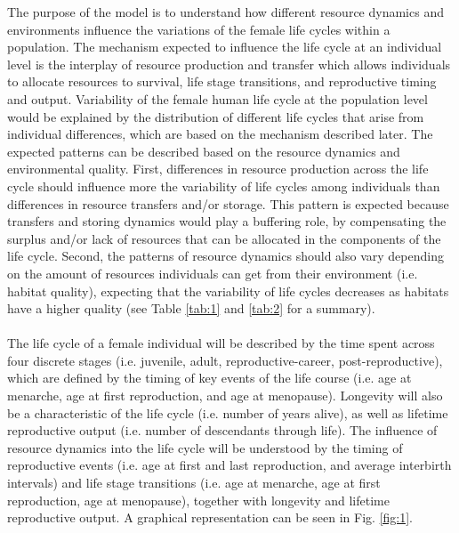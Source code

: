\documentclass{article}
\begin{document}
The purpose of the model is to understand how different resource dynamics and environments influence the variations of the female life cycles within a population. The mechanism expected to influence the life cycle at an individual level is the interplay of resource production and transfer which allows individuals to allocate resources to survival, life stage transitions, and reproductive timing and output. Variability of the female human life cycle at the population level would be explained by the distribution of different life cycles that arise from individual differences, which are based on the mechanism described later. The expected patterns can be described based on the resource dynamics and environmental quality. First, differences in resource production across the life cycle should influence more the variability of life cycles among individuals than differences in resource transfers and/or storage. This pattern is expected because transfers and storing dynamics would play a buffering role, by compensating the surplus and/or lack of resources that can be allocated in the components of the life cycle. Second, the patterns of resource dynamics should also vary depending on the amount of resources individuals can get from their environment (i.e. habitat quality), expecting that the variability of life cycles decreases as habitats have a higher quality (see Table \ref{tab:1} and \ref{tab:2} for a summary).
\\\\
The life cycle of a female individual will be described by the time spent across four discrete stages (i.e. juvenile, adult, reproductive-career, post-reproductive), which are defined by the timing of key events of the life course (i.e. age at menarche, age at first reproduction, and age at menopause). Longevity will also be a characteristic of the life cycle (i.e. number of years alive), as well as lifetime reproductive output (i.e. number of descendants through life). The influence of resource dynamics into the life cycle will be understood by the timing of reproductive events (i.e. age at first and last reproduction, and average interbirth intervals) and life stage transitions (i.e. age at menarche, age at first reproduction, age at menopause), together with longevity and lifetime reproductive output. A graphical representation can be seen in Fig. \ref{fig:1}.
\\\\
\end{document}
